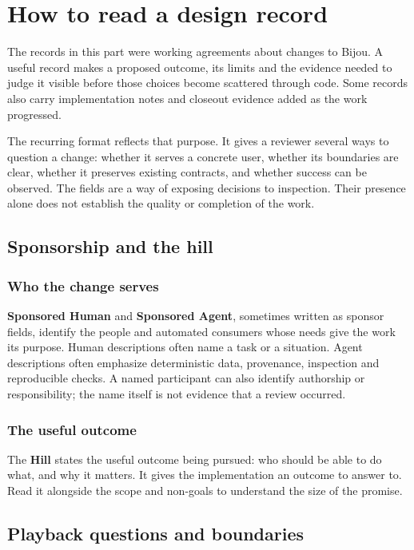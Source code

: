 \chapter*{How to read a design record}

The records in this part were working agreements about changes to Bijou. A useful record makes a proposed outcome, its limits and the evidence needed to judge it visible before those choices become scattered through code. Some records also carry implementation notes and closeout evidence added as the work progressed.

The recurring format reflects that purpose. It gives a reviewer several ways to question a change: whether it serves a concrete user, whether its boundaries are clear, whether it preserves existing contracts, and whether success can be observed. The fields are a way of exposing decisions to inspection. Their presence alone does not establish the quality or completion of the work.

\section*{Sponsorship and the hill}

\subsection*{Who the change serves}

\textbf{Sponsored Human} and \textbf{Sponsored Agent}, sometimes written as sponsor fields, identify the people and automated consumers whose needs give the work its purpose. Human descriptions often name a task or a situation. Agent descriptions often emphasize deterministic data, provenance, inspection and reproducible checks. A named participant can also identify authorship or responsibility; the name itself is not evidence that a review occurred.

\subsection*{The useful outcome}

The \textbf{Hill} states the useful outcome being pursued: who should be able to do what, and why it matters. It gives the implementation an outcome to answer to. Read it alongside the scope and non-goals to understand the size of the promise.

\section*{Playback questions and boundaries}

